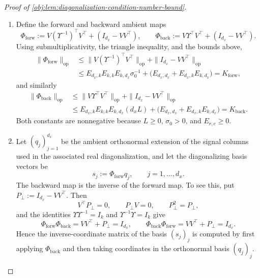 \begin{proof}[Proof of \cref{obj:lem:diagonalization-condition-number-bound}]
\begin{enumerate}
\item Define the forward and backward ambient maps
\[
\Phi_{\mathrm{forw}}
:=
V(\Upsilon^{-1})^\top V^\top+(I_{d_x}-VV^\top),
\qquad
\Phi_{\mathrm{back}}
:=
V\Upsilon^\top V^\top+(I_{d_x}-VV^\top).
\]
Using submultiplicativity, the triangle inequality, and the bounds above,
\[
\begin{aligned}
\|\Phi_{\mathrm{forw}}\|_{\mathrm{op}}
&\le
\|V(\Upsilon^{-1})^\top V^\top\|_{\mathrm{op}}
+
\|I_{d_x}-VV^\top\|_{\mathrm{op}}\\
&\le
E_{d_x,k}E_{k,k}E_{k,d_x}\sigma_0^{-1}
+
\bigl(E_{d_x,d_x}+E_{d_x,k}E_{k,d_x}\bigr)
=
K_{\mathrm{forw}},
\end{aligned}
\]
and similarly
\[
\begin{aligned}
\|\Phi_{\mathrm{back}}\|_{\mathrm{op}}
&\le
\|V\Upsilon^\top V^\top\|_{\mathrm{op}}
+
\|I_{d_x}-VV^\top\|_{\mathrm{op}}\\
&\le
E_{d_x,k}E_{k,k}E_{k,d_x}(d_xL)
+
\bigl(E_{d_x,d_x}+E_{d_x,k}E_{k,d_x}\bigr)
=
K_{\mathrm{back}} .
\end{aligned}
\]
Both constants are nonnegative because \(L\ge0\), \(\sigma_0>0\), and \(E_{r,c}\ge0\). %

\item Let \((q_j)_{j=1}^{d_x}\) be the ambient orthonormal extension of the signal columns used in the associated real diagonalization, and let the diagonalizing basis vectors be
\[
s_j:=\Phi_{\mathrm{forw}}q_j,\qquad j=1,\ldots,d_x .
\]
The backward map is the inverse of the forward map. To see this, put \(P_\perp:=I_{d_x}-VV^\top\). Then
\[
V^\top P_\perp=0,\qquad P_\perp V=0,\qquad P_\perp^2=P_\perp,
\]
and the identities \(\Upsilon\Upsilon^{-1}=I_k\) and \(\Upsilon^{-1}\Upsilon=I_k\) give
\[
\Phi_{\mathrm{forw}}\Phi_{\mathrm{back}}
=
VV^\top+P_\perp
=
I_{d_x},
\qquad
\Phi_{\mathrm{back}}\Phi_{\mathrm{forw}}
=
VV^\top+P_\perp
=
I_{d_x}.
\]
Hence the inverse-coordinate matrix of the basis \((s_j)_j\) is computed by first applying \(\Phi_{\mathrm{back}}\) and then taking coordinates in the orthonormal basis \((q_j)_j\). %


\end{enumerate}
\end{proof}
